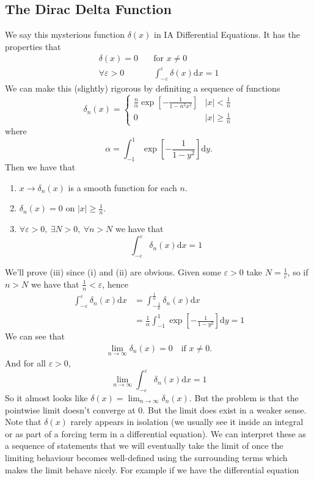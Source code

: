 \documentclass{article}
\begin{document}
\subsection{The Dirac Delta Function}
We say this mysterious function $ \delta(x) $ in IA Differential Equations. It has the properties that
\begin{align*}
	\delta(x)=0 &\quad\text{for } x\ne 0\\
	\forall \varepsilon>0 &\quad \int_{-\varepsilon}^\varepsilon\delta(x)\mathrm dx=1
\end{align*}
We can make this (slightly) rigorous by definiting a sequence of functions
\[
  \delta_n(x)=\begin{cases}
	  \frac n\alpha\exp\left[-\frac 1{1-n^2x^2}\right]& |x|<\frac 1n\\
	  0 & |x|\ge \frac 1n
  \end{cases}
\]
where
\[
	\alpha=\int_{-1}^1\exp\left[-\frac 1{1-y^2}\right]\mathrm dy.
\]
Then we have that
\begin{enumerate}
	\item $ x\to \delta_n(x) $ is a smooth function for each $ n $.
	\item $ \delta_n(x)=0 $ on $ |x|\ge \frac 1n $.
	\item $\forall\varepsilon>0,\ \exists N>0, \ \forall n>N $ we have that
		\[
			\int_{-\varepsilon}^\varepsilon\delta_n(x)\mathrm dx=1
		\]
\end{enumerate}
We'll prove (iii) since (i) and (ii) are obvious. Given some $ \varepsilon>0 $ take $ N=\frac 1\varepsilon $, so if $ n>N $ we have that $ \frac 1n<\varepsilon $, hence
\begin{align*}
	\int_{-\varepsilon}^\varepsilon\delta_n(x)\mathrm dx&=\int_{-\frac1n}^{\frac1n}\delta_n(x)\mathrm dx\\
							    &= \frac1\alpha\int_{-1}^1\exp\left[-\frac1{1-y^2}\right]\mathrm dy=1
\end{align*}
We can see that
\begin{align*}
	\lim_{n\to\infty}\delta_n(x)=0\quad\text{if } x\ne 0.
\end{align*}
And for all $ \varepsilon>0 $,
\[
	\lim_{n\to\infty}\int_{-\varepsilon}^\varepsilon\delta_n(x)\mathrm dx=1
\]
So it almost looks like $ \delta(x)=\lim_{n\to\infty}\delta_n(x) $. But the problem is that the pointwise limit doesn't converge at $ 0 $. But the limit does exist in a weaker sense. Note that $ \delta(x) $ rarely appears in isolation (we usually see it inside an integral or as part of a forcing term in a differential equation). We can interpret these as a sequence of statements that we will eventually take the limit of once the limiting behaviour becomes well-defined using the surrounding terms which makes the limit behave nicely. For example if we have the differential equation
\end{document}
